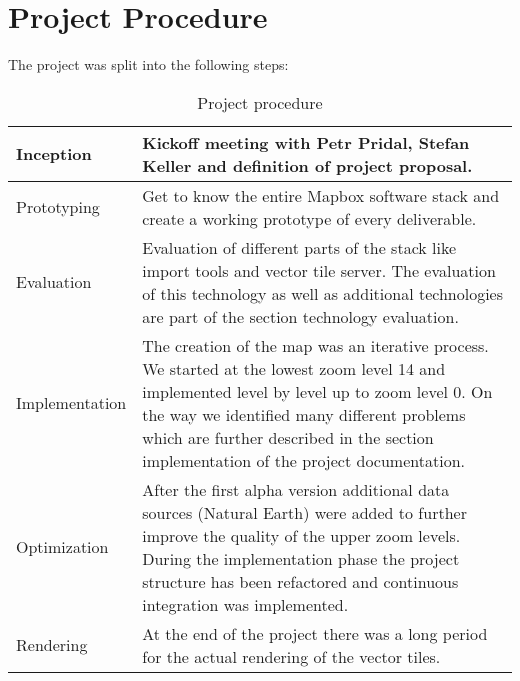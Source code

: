 \newpage
\section{Project Procedure}

The project was split into the following steps:

\begin{table}[H]

    \begin{tabular}{p{2.5cm} p{10cm}}

    \hline    

	Inception & Kickoff meeting with Petr Pridal, Stefan Keller and
  definition of project proposal. \\ \hline

	Prototyping & Get to know the entire Mapbox software stack and create
  a working prototype of every deliverable. \\ \hline

	Evaluation & Evaluation of different parts of the
  stack like import tools and vector tile server. The evaluation of
  this technology as well as additional technologies are part of the
  section technology evaluation. \\ \hline

	Implementation & The creation of the map was an iterative process. We
  started at the lowest zoom level 14 and implemented level by level up
  to zoom level 0. On the way we identified many different problems
  which are further described in the section implementation of the
  project documentation. \\ \hline

	Optimization & After the first alpha version
  additional data sources (Natural Earth) were added to further improve the quality of the upper zoom levels. During the implementation phase the project structure has been refactored and continuous integration was implemented. \\ \hline
  
  Rendering & At the end of the project there was a long period for the
  actual rendering of the vector tiles. \\ \hline

    \end{tabular}
    \caption[Project Procedure]{Project procedure}
\end{table}

\newpage